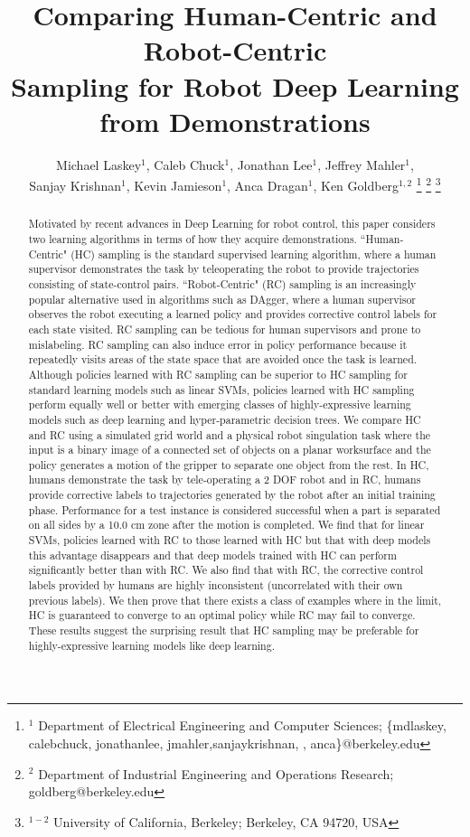 \documentclass[10pt, conference]{ieeeconf}      %
\title{Comparing Human-Centric and Robot-Centric \\
Sampling for Robot Deep Learning from Demonstrations}
\author{Michael Laskey$^1$, Caleb Chuck$^1$, Jonathan Lee$^1$, Jeffrey Mahler$^1$,\\ Sanjay Krishnan$^1$, Kevin Jamieson$^1$, Anca Dragan$^1$, Ken Goldberg$^{1,2}$
\thanks{$^1$ Department of Electrical Engineering and Computer Sciences; {\small \{mdlaskey, calebchuck, jonathan\textunderscore lee, jmahler,sanjaykrishnan, , anca\}@berkeley.edu} }%
\thanks{$^2$ Department of Industrial Engineering and Operations Research; {\small goldberg@berkeley.edu}}%
\thanks{$^{1-2}$ University of California, Berkeley;  Berkeley, CA 94720, USA}%
}
\begin{document}
\maketitle
\thispagestyle{empty}
\pagestyle{empty}







\begin{abstract}
Motivated by recent advances in Deep Learning for robot control, this paper considers two learning algorithms in terms of how they acquire demonstrations. ``Human-Centric" (HC) sampling is the standard supervised learning algorithm, where a human supervisor demonstrates the task by teleoperating the robot to provide trajectories consisting of state-control pairs.  ``Robot-Centric" (RC) sampling is an increasingly popular alternative used in algorithms such as DAgger, where a human supervisor observes the robot executing a learned policy and provides corrective control labels for each state visited.  RC sampling can be tedious for human supervisors and prone to mislabeling.  RC sampling can also induce error in policy performance because it repeatedly visits areas of the state space that are avoided once the task is learned. Although policies learned with RC sampling can be superior to HC sampling for standard learning models such as linear SVMs, policies learned with HC sampling perform equally well or better with emerging classes of highly-expressive learning models such as deep learning and hyper-parametric decision trees.  We compare HC and RC using a simulated grid world and a physical robot singulation task where the input is a binary image of a connected set of objects on a planar worksurface and the policy generates a motion of the gripper to separate one object from the rest.  In HC, humans demonstrate the task by tele-operating a 2 DOF robot and in RC, humans provide corrective labels to trajectories generated by the robot after an initial training phase. Performance for a test instance is considered successful when a part is separated on all sides by a 10.0 cm zone after the motion is completed.  We find that for linear SVMs, policies learned with RC to those learned with HC but that with deep models this advantage disappears and that deep models trained with HC can perform significantly better than with RC.  We also find that with RC, the corrective control labels provided by humans are highly inconsistent (uncorrelated with their own previous labels).  We then prove that there exists a class of examples where in the limit, HC is guaranteed to converge to an optimal policy while RC may fail to converge. These results suggest the surprising result that HC sampling may be preferable for highly-expressive learning models like deep learning.
 \end{abstract}
\end{document}
